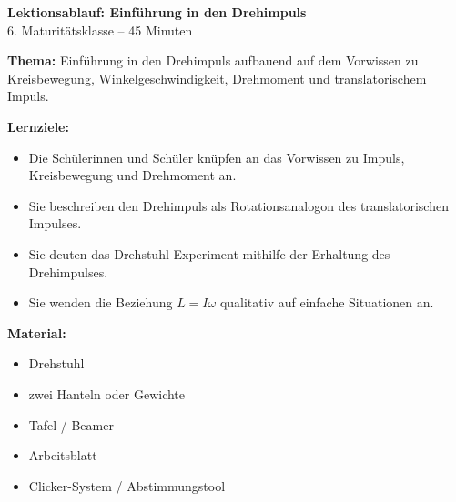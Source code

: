 \documentclass[12pt,a4paper]{article}
\begin{document}
\begin{center}
    {\LARGE \textbf{Lektionsablauf: Einführung in den Drehimpuls}}\\[0.3cm]
    \large 6. Maturitätsklasse -- 45 Minuten
\end{center}

\vspace{0.4cm}

\textbf{Thema:} Einführung in den Drehimpuls aufbauend auf dem Vorwissen zu Kreisbewegung, Winkelgeschwindigkeit, Drehmoment und translatorischem Impuls.

\textbf{Lernziele:}
\begin{itemize}[leftmargin=1.2cm]
    \item Die Schülerinnen und Schüler knüpfen an das Vorwissen zu Impuls, Kreisbewegung und Drehmoment an.
    \item Sie beschreiben den Drehimpuls als Rotationsanalogon des translatorischen Impulses.
    \item Sie deuten das Drehstuhl-Experiment mithilfe der Erhaltung des Drehimpulses.
    \item Sie wenden die Beziehung \(L = I\omega\) qualitativ auf einfache Situationen an.
\end{itemize}

\textbf{Material:}
\begin{itemize}[leftmargin=1.2cm]
    \item Drehstuhl
    \item zwei Hanteln oder Gewichte
    \item Tafel / Beamer
    \item Arbeitsblatt
    \item Clicker-System / Abstimmungstool
\end{itemize}

\vspace{0.3cm}

\renewcommand{\arraystretch}{1.4}
\setlength{\LTpre}{6pt}
\setlength{\LTpost}{6pt}
\end{document}
